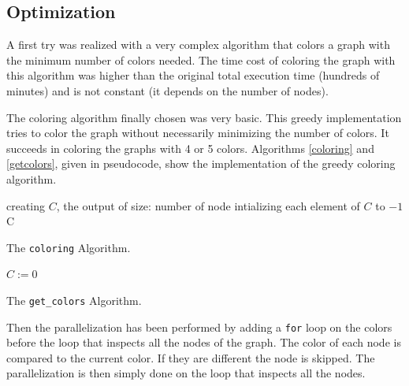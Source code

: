 \documentclass[fleqn,11pt]{SelfArx} %
\theoremstyle{definition}
\begin{document}
\subsection{Optimization}

A first try was realized with a very complex algorithm that colors a graph with the minimum number of colors needed. The time cost of coloring the graph with this algorithm was higher than the original total execution time (hundreds of minutes) and is not constant (it depends on the number of nodes).

The coloring algorithm finally chosen was very basic. This greedy implementation tries to color the graph without necessarily minimizing the number of colors. It succeeds in coloring the graphs with 4 or 5 colors. Algorithms \ref{coloring} and \ref{getcolors}, given in pseudocode, show the implementation of the greedy coloring algorithm.

\begin{algorithm}[h]

\BlankLine

creating $C$, the output of size: number of node\;
intializing each element of $C$ to $-1$\;
\Return C\;

\caption{The \texttt{coloring} Algorithm.}
\label{coloring}
\end{algorithm}

\begin{algorithm}[h]
\SetAlgoLined
{}

\BlankLine

$C := 0$\;

\caption{The \texttt{get\_colors} Algorithm.}
\label{getcolors}
\end{algorithm}

Then the parallelization has been performed by adding a \verb+for+ loop on the colors before the loop that inspects all the nodes of the graph. The color of each node is compared to the current color. If they are different the node is skipped. The parallelization is then simply done on the loop that inspects all the nodes.
\end{document}
